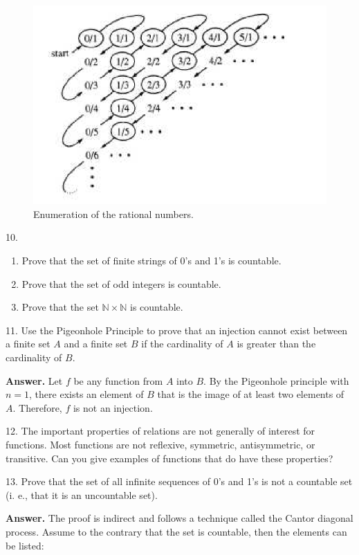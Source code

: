 \documentclass[10pt,]{book}
\theoremstyle{plain}
\theoremstyle{definition}
\theoremstyle{definition}
\theoremstyle{definition}
\begin{document}
\begin{exercisegroup}
\begin{figure}
\centering
\includegraphics[width=1\linewidth]{images/fig-sol-7-2-9.png}
\caption{Enumeration of the rational numbers.
				 \label{fig-sol-7-2-9}}
\end{figure}
\item[10.]\hypertarget{exercise-18}{}\leavevmode%
\begin{enumerate}[label=\alph*]
\item\hypertarget{li-65}{} Prove that the set of finite strings of 0's and 1's is countable.%
\item\hypertarget{li-66}{}Prove that the set of odd integers is countable.%
\item\hypertarget{li-67}{}Prove that the set  \(\mathbb{N}\times  \mathbb{N}\) is countable.%
\end{enumerate}
%
\par\smallskip
\item[11.]\hypertarget{exercise-19}{} Use the Pigeonhole Principle to prove that an injection cannot exist between a finite set \(A\) and a finite set \(B\) if the
cardinality of \(A\) is greater than the cardinality of \(B\).%
\par\smallskip
\par\smallskip
\noindent\textbf{Answer.}\hypertarget{answer-9}{}\quad
 Let \(f\) be any function from \(A\) into \(B\). By the Pigeonhole principle with \(n=1\), there exists an element of \(B\) that is the image of at least two elements of \(A\). Therefore, \(f\) is not an injection.
%
\item[12.]\hypertarget{exercise-20}{} The important properties of relations are not generally of interest for functions. Most functions are not reflexive, symmetric, antisymmetric,
or transitive. Can you give examples of functions that do have these properties?%
\par\smallskip
\item[13.]\hypertarget{exercise-21}{} Prove that the set of all infinite sequences of 0's and 1's is not a countable set (i. e., that it is an uncountable set). %
\par\smallskip
\par\smallskip
\noindent\textbf{Answer.}\hypertarget{answer-10}{}\quad
 The proof is indirect and follows a technique called the Cantor diagonal process.
 Assume to the contrary that the set is countable, then the elements can be listed:


\end{exercisegroup}
\end{document}

